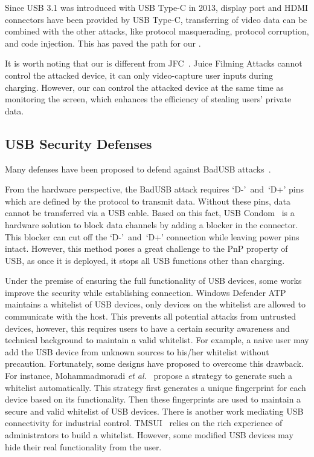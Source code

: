 Since \ac{USB} 3.1 was introduced with \ac{USB} Type-C in 2013, display port and HDMI
connectors have been provided by \ac{USB} Type-C, transferring of video data can be
combined with the other attacks, like protocol masquerading,  protocol
corruption, and code injection. This has paved the path for our \tool.

It is worth noting that our \tool is different from JFC~\cite{JFC}. Juice Filming Attacks cannot control the attacked device, it can only video-capture user inputs during charging. However, our \tool can control the attacked device at the same time as monitoring the screen, which enhances the efficiency of stealing users' private data. 

\subsection{USB Security Defenses}
\label{subsec:usb_defence}

Many defenses have been proposed to defend against BadUSB attacks~\cite{sok}.

From the hardware perspective, the BadUSB attack requires \mbox{`D-' and `D+'} pins which
are defined by the protocol to transmit data. Without these pins, data cannot 
be transferred via a \ac{USB} cable. Based
on this fact, \ac{USB} Condom~\cite{Condom} is a hardware solution to block data
channels by adding a blocker in the connector. This blocker can cut off the \mbox{`D-' and `D+'} connection while leaving power pins intact. However, this method poses
a great challenge to the \ac{PnP} property of \ac{USB}, as once it is deployed, it
stops all \ac{USB} functions other than charging.

Under the premise of ensuring the full functionality of \ac{USB} devices, some works
improve the security while establishing connection. Windows Defender
ATP~\cite{windenfenderwhite} maintains a whitelist of \ac{USB} devices, only devices
on the whitelist are allowed to communicate with the host. This prevents all
potential attacks from untrusted devices, however, this requires users to have a
certain security awareness and technical background to maintain a valid
whitelist. For example, a naive user may add the \ac{USB} device from unknown
sources to his/her whitelist without precaution. Fortunately, some designs have proposed to overcome
this drawback. For instance, Mohammadmoradi \emph{et al.}~\cite{mohammadmoradi2018making} propose a strategy to generate such a
whitelist automatically. This strategy first generates a unique fingerprint for
each device based on its functionality. Then these fingerprints are used to
maintain a secure and valid whitelist of \ac{USB} devices. There is another work
mediating \ac{USB} connectivity for industrial control. TMSUI~\cite{yang2015tmsui}
relies on the rich experience of administrators to build a whitelist. However, some
modified \ac{USB} devices may hide their real functionality from the user.

